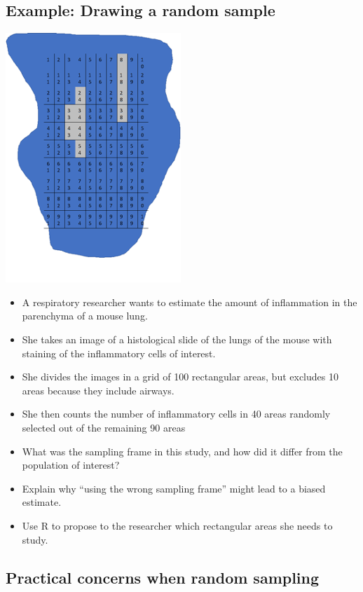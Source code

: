 \documentclass[
]{book}
\providecommand{\tightlist}{%
  \setlength{\itemsep}{0pt}\setlength{\parskip}{0pt}}
\begin{document}
\hypertarget{example-drawing-a-random-sample}{%
\subsection{Example: Drawing a random sample}\label{example-drawing-a-random-sample}}

\includegraphics[width=0.5\linewidth]{./1_48}

\begin{itemize}
\tightlist
\item
  A respiratory researcher wants to estimate the amount of inflammation in the parenchyma of a mouse lung.
\item
  She takes an image of a histological slide of the lungs of the mouse with staining of the inflammatory cells of interest.
\item
  She divides the images in a grid of 100 rectangular areas, but excludes 10 areas because they include airways.
\item
  She then counts the number of inflammatory cells in 40 areas randomly selected out of the remaining 90 areas
\item
  What was the sampling frame in this study, and how did it differ from the population of interest?
\item
  Explain why ``using the wrong sampling frame'' might lead to a biased estimate.
\item
  Use R to propose to the researcher which rectangular areas she needs to study.
\end{itemize}

\hypertarget{practical-concerns-when-random-sampling}{%
\subsection{Practical concerns when random sampling}\label{practical-concerns-when-random-sampling}}
\end{document}
